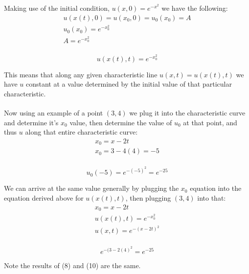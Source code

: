 \documentclass{article}
\begin{document}
Making use of the initial condition, $u(x, 0) = e^{-x^2}$ we have the following:
\begin{equation}
\begin{aligned}
u(x(t), 0) = u(x_0, 0) = u_0(x_0) = A\\
u_0(x_0) = e^{-x_0^2}\\
A = e^{-x_0^2}\\
\end{aligned}
\end{equation}
\begin{tcolorbox}[minipage,colback=white,arc=0pt,outer arc=0pt]
\begin{equation}
u(x(t), t) = e^{-x_0^2}
\end{equation}
\end{tcolorbox}
This means that along any given characteristic line $u(x, t) = u(x(t), t)$ we have $u$ constant at a value determined by the initial value of that particular characteristic.\\
\\
Now using an example of a point $(3,4)$ we plug it into the characteristic curve and determine it's $x_0$ value, then determine the value of $u_0$ at that point, and thus $u$ along that entire characteristic curve:
\begin{equation}
\begin{aligned}
x_0 = x - 2t\\
x_0 = 3 - 4(4) = -5\\
\end{aligned}
\end{equation}
\begin{tcolorbox}[minipage,colback=white,arc=0pt,outer arc=0pt]
\begin{equation}
u_0(-5) = e^{-(-5)^2} = e^{-25}
\end{equation}
\end{tcolorbox}
We can arrive at the same value generally by plugging the $x_0$ equation into the equation derived above for $u(x(t), t)$, then plugging $(3,4)$ into that:
\begin{equation}
\begin{aligned}
x_0 = x - 2t\\
u(x(t), t) = e^{-x_0^2}\\
u(x, t) = e^{-(x - 2t)^2}\\
\end{aligned}
\end{equation}
\begin{tcolorbox}[minipage,colback=white,arc=0pt,outer arc=0pt]
\begin{equation}
e^{-(3 - 2(4)^2} = e^{-25}
\end{equation}
\end{tcolorbox}
Note the results of (8) and (10) are the same.
\end{document}
